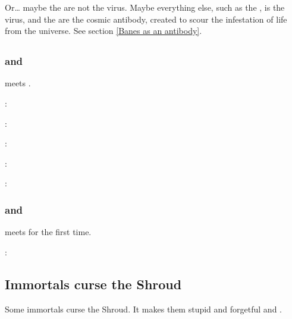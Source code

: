 Or\ldots{} maybe the \banes{} are not the virus. Maybe everything else, such as the \dragons, is the virus, and the \banes{} are the cosmic antibody, created to scour the infestation of life from the universe. See section \ref{Banes as an antibody}. 







\subsection{\Vizsherioch}
\subsubsection{\Rathyon{} and \Vizsherioch}
 meets . 

\Vizsherioch: 

\Rathyon: 

\Vizsherioch: 

\Rathyon: 

\Vizsherioch: 





\subsubsection{\Ishnaruchaefir{} and \Vizsherioch}
\Ishnaruchaefir{} meets \Vizsherioch{} for the first time. 

\Ishnaruchaefir: 







\subsection{Immortals curse the Shroud}
Some immortals curse the Shroud. 
It makes them stupid and forgetful and . 






















